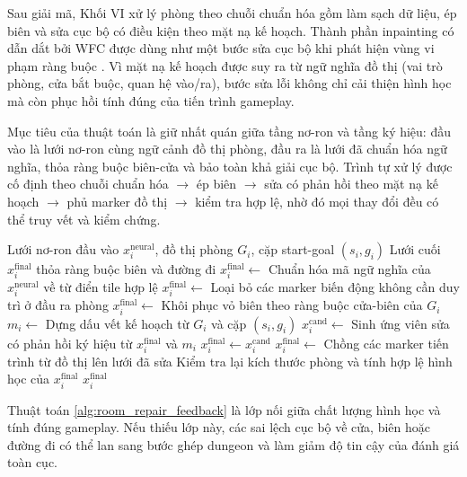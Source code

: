 \documentclass[oneside,a4paper,12pt]{extreport}
\begin{document}
Sau giải mã, Khối VI xử lý phòng theo chuỗi chuẩn hóa gồm làm sạch dữ liệu, ép biên và sửa cục bộ có điều kiện theo mặt nạ kế hoạch. Thành phần inpainting có dẫn dắt bởi WFC được dùng như một bước sửa cục bộ khi phát hiện vùng vi phạm ràng buộc \cite{karth2021wfc}. Vì mặt nạ kế hoạch được suy ra từ ngữ nghĩa đồ thị (vai trò phòng, cửa bắt buộc, quan hệ vào/ra), bước sửa lỗi không chỉ cải thiện hình học mà còn phục hồi tính đúng của tiến trình gameplay.

Mục tiêu của thuật toán là giữ nhất quán giữa tầng nơ-ron và tầng ký hiệu: đầu vào là lưới nơ-ron cùng ngữ cảnh đồ thị phòng, đầu ra là lưới đã chuẩn hóa ngữ nghĩa, thỏa ràng buộc biên-cửa và bảo toàn khả giải cục bộ. Trình tự xử lý được cố định theo chuỗi chuẩn hóa $\rightarrow$ ép biên $\rightarrow$ sửa có phản hồi theo mặt nạ kế hoạch $\rightarrow$ phủ marker đồ thị $\rightarrow$ kiểm tra hợp lệ, nhờ đó mọi thay đổi đều có thể truy vết và kiểm chứng.

\begin{algorithm}[H]
\caption{Sửa phòng có phản hồi ký hiệu ở tầng hậu xử lý}
\label{alg:room_repair_feedback}
\begin{algorithmic}[1]
\Require Lưới nơ-ron đầu vào $x_i^{\text{neural}}$, đồ thị phòng $G_i$, cặp start-goal $(s_i,g_i)$
\Ensure Lưới cuối $x_i^{\text{final}}$ thỏa ràng buộc biên và đường đi
\State $x_i^{\text{final}} \gets$ Chuẩn hóa mã ngữ nghĩa của $x_i^{\text{neural}}$ về từ điển tile hợp lệ
\State $x_i^{\text{final}} \gets$ Loại bỏ các marker biến động không cần duy trì ở đầu ra phòng
\State $x_i^{\text{final}} \gets$ Khôi phục vỏ biên theo ràng buộc cửa-biên của $G_i$
\State $m_i \gets$ Dựng dấu vết kế hoạch từ $G_i$ và cặp $(s_i,g_i)$
  \State $x_i^{\text{cand}} \gets$ Sinh ứng viên sửa có phản hồi ký hiệu từ $x_i^{\text{final}}$ và $m_i$
    \State $x_i^{\text{final}} \gets x_i^{\text{cand}}$
  \EndIf
\EndIf
\State $x_i^{\text{final}} \gets$ Chồng các marker tiến trình từ đồ thị lên lưới đã sửa
\State Kiểm tra lại kích thước phòng và tính hợp lệ hình học của $x_i^{\text{final}}$
\State \Return $x_i^{\text{final}}$
\end{algorithmic}
\end{algorithm}

Thuật toán \ref{alg:room_repair_feedback} là lớp nối giữa chất lượng hình học và tính đúng gameplay. Nếu thiếu lớp này, các sai lệch cục bộ về cửa, biên hoặc đường đi có thể lan sang bước ghép dungeon và làm giảm độ tin cậy của đánh giá toàn cục.
\end{document}
